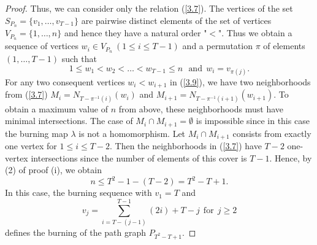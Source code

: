 \documentclass[10pt,a4paper]{amsart}
\begin{document}
\begin{proof}
Thus,  we can consider only the relation  (\ref{3.7}). 
The vertices  of the set $S_{P_n}=\{v_1, \dots , v_{T-1}\}$ are pairwise distinct  elements of the set of vertices 
$V_{P_{n}}=\{1, \dots , n\}$ and hence they  have a natural  order "$<$". Thus we obtain a sequence of  vertices $w_i \in V_{P_n} \ (1\leq i\leq T-1)$ and a permutation  $\pi$  of elements $(1, \dots, T-1)$ such that 
\begin{equation}\label{3.9}
1\leq w_1< w_2< \dots <w_{T-1}\leq n     \ \ \ \text{and} \ \  w_i=v_{\pi(j)}. 
\end{equation} 
For any two consequent vertices $w_i< w_{i+1}$ in (\ref{3.9}),  we 
have two neighborhoods from (\ref{3.7})
$M_{i}=N_{T-\pi^{-1}(i)}(w_i)$  and $M_{i+1}=N_{T-\pi^{-1}(i+1)}(w_{i+1})$.   To obtain   a maximum value of $n$ from above,  these neighborhoods must have minimal intersections.  The case of $M_{i}\cap M_{i+1}=\emptyset$ is impossible since in this case the burning map $\lambda$  is not a homomorphism.   Let  $M_i\cap M_{i+1}$ consists from  exactly one vertex for $1\leq i\leq T-2$. Then  the neighborhoods in  (\ref{3.7}) have $T-2$ one-vertex intersections since  the number of elements of this cover is $T-1$.  Hence, by (2) of proof  (i), we obtain 
\begin{equation}\label{3.10}
n\le T^2-1-(T-2)=T^2-T+1. 
\end{equation}
In this case, the burning sequence with $v_1=T$ and 
$$
v_j=\sum_{i=T-(j-1)}^{T-1}(2 i)+T-j  \ \ \text{for} \ \  j\ge 2
$$
 defines the burning of the path graph  $P_{T^2-T+1}$.
\end{proof}
\end{document}
